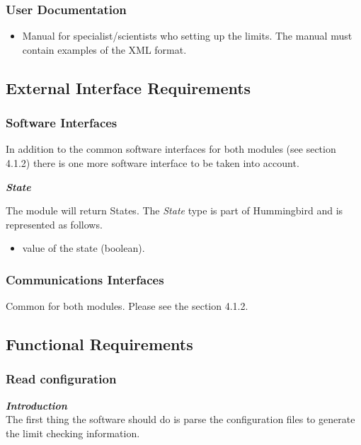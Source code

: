 \subsubsection{User Documentation}
\begin{itemize}
\item Manual for specialist/scientists who setting up the limits. The manual must contain examples of the XML format.
\end{itemize}
\pagebreak
\subsection{External Interface Requirements}

\subsubsection{Software Interfaces}

In addition to the common software interfaces for both modules (see section 4.1.2) there is one more software interface to be taken into account.

\textbf{\emph{State}}

The module will return States. The \emph{State} type is part of Hummingbird and is represented as follows.

\begin{itemize}
\item value of the state (boolean).

\end{itemize}


\subsubsection{Communications Interfaces}

Common for both modules. Please see the section 4.1.2.

\subsection{Functional Requirements}

\subsubsection{Read configuration}

\textbf{\emph{Introduction}}\\
The first thing the software should do is parse the configuration files to generate the limit checking information.\\

